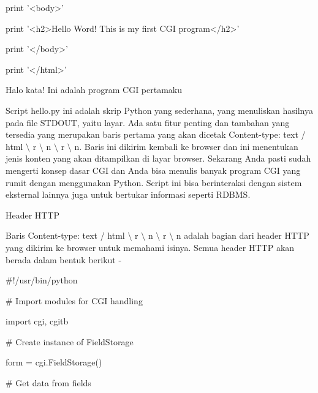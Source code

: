 \begin {enumerate}
\begin {enumerate}
\noindent
print '<body>' \par
\noindent
print '<h2>Hello Word! This is my first CGI program</h2>' \par
\noindent
print '</body>' \par
\noindent
print '</html>' \par
\vspace{12pt}
\vspace{12pt}
\noindent
Halo kata! Ini adalah program CGI pertamaku \par
\vspace{12pt}
Script hello.py ini adalah skrip Python yang sederhana, yang menuliskan hasilnya pada file STDOUT, yaitu layar. Ada satu fitur penting dan tambahan yang tersedia yang merupakan baris pertama yang akan dicetak Content-type: text / html  $  \setminus  $ r  $  \setminus  $ n  $  \setminus  $ r  $  \setminus  $ n. Baris ini dikirim kembali ke browser dan ini menentukan jenis konten yang akan ditampilkan di layar browser. Sekarang Anda pasti sudah mengerti konsep dasar CGI dan Anda bisa menulis banyak program CGI yang rumit dengan menggunakan Python. Script ini bisa berinteraksi dengan sistem eksternal lainnya juga untuk bertukar informasi seperti RDBMS. \par
\vspace{12pt}
\vspace{12pt}
\vspace{12pt}
\vspace{12pt}
\noindent
Header HTTP \par
\vspace{12pt}
\noindent
Baris Content-type: text / html  $  \setminus  $ r  $  \setminus  $ n  $  \setminus  $ r  $  \setminus  $ n adalah bagian dari header HTTP yang dikirim ke browser untuk memahami isinya. Semua header HTTP akan berada dalam bentuk berikut - \par
\noindent
 $  \#  $!/usr/bin/python \par
\vspace{12pt}
\noindent
 $  \#  $ Import modules for CGI handling  \par
\noindent
import cgi, cgitb  \par
\vspace{12pt}
\noindent
 $  \#  $ Create instance of FieldStorage  \par
\noindent
form = cgi.FieldStorage()  \par
\vspace{12pt}
\noindent
 $  \#  $ Get data from fields \par

\end{enumerate}
\end{enumerate}
